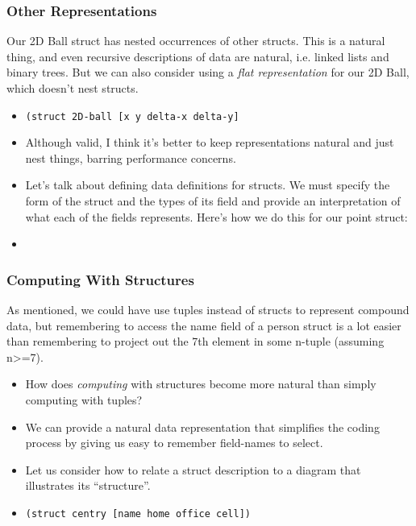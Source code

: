 \documentclass{beamer}
\begin{document}
\begin{frame}
  \frametitle{Other Representations}
  Our 2D Ball struct has nested occurrences of other structs. This is a natural thing, and even recursive descriptions of data are natural, i.e.
  linked lists and binary trees. But we can also consider using a \emph{flat representation} for our 2D Ball, which doesn't nest structs.
  \begin{itemize}
  \item<2-> \texttt{(struct 2D-ball [x y delta-x delta-y]}
  \item<3-> Although valid, I think it's better to keep representations natural and just nest things, barring performance concerns.
  \item<4-> Let's talk about defining data definitions for structs. We must specify the form of the struct and the types of its field and provide an interpretation of what
    each of the fields represents. Here's how we do this for our point struct:
  \item<5->\pointDefinition
  \end{itemize}
\end{frame}


\begin{frame}
  \frametitle{Computing With Structures}
  As mentioned, we could have use tuples instead of structs to represent
  compound data, but remembering to access the name field of a person
  struct is a lot easier than remembering to project out the 7th element
  in some n-tuple (assuming n>=7).
  \begin{itemize}
  \item<2-> How does \emph{computing} with structures become more natural than simply computing with tuples?  
  \item<3-> We can provide  a natural data representation that simplifies the coding process by giving us easy to remember
    field-names to select.
  \item<4-> Let us consider how to relate a struct description
    to a diagram that illustrates its ``structure''.
  \item<5-> \texttt{(struct centry [name home office cell])}
  \end{itemize}
\end{frame}
\end{document}
